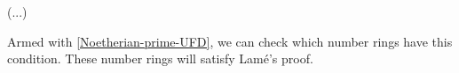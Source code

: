\begin{example}
(...)
\end{example}

Armed with \cref{Noetherian-prime-UFD}, we can check which number rings have this condition. These number rings will satisfy Lamé's proof.

